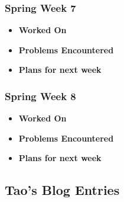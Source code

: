\documentclass[compsoc,draftclsnofoot,onecolumn,10pt]{IEEEtran}
\begin{document}
\subsubsection{Spring Week 7}
\begin{itemize}
    \item {\textbf{Worked On}}
    \begin{itemize}
        
    \end{itemize}

    \item {\textbf{Problems Encountered}}
    \begin{itemize}
        
    \end{itemize}

    \item{\textbf{Plans for next week}}
    \begin{itemize}
        
    \end{itemize}

\end{itemize}

\subsubsection{Spring Week 8}
\begin{itemize}
    \item {\textbf{Worked On}}
    \begin{itemize}
        
    \end{itemize}

    \item {\textbf{Problems Encountered}}
    \begin{itemize}
        
    \end{itemize}

    \item{\textbf{Plans for next week}}
    \begin{itemize}
        
    \end{itemize}

\end{itemize}

\subsection{Tao's Blog Entries}
\end{document}
